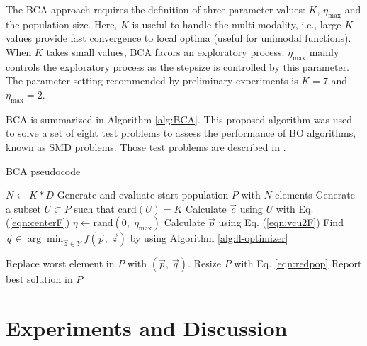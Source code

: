 \documentclass[conference]{IEEEtran}
\begin{document}
The BCA approach requires the definition of three parameter values: $K$, $\eta_{\max}$
and the population size. Here, $K$ is useful to handle the multi-modality, i.e.,
large $K$ values provide fast convergence to local optima (useful for unimodal functions).
When $K$ takes small values, BCA favors an exploratory process. $\eta_{\max}$ mainly
controls the exploratory process as the stepsize is controlled by this parameter.
The parameter setting recommended by preliminary experiments is $K = 7$ and $\eta_{\max} = 2$.

BCA is summarized in Algorithm \ref{alg:BCA}. This proposed algorithm was used to
solve a set of eight test problems to assess the performance of BO algorithms,
known as SMD problems. Those test problems  are described
in \cite{angelo2013differential,sinha2012unconstrained,sinha2014test}.
% 
% 
% 
% 
\begin{algorithm}[!ht]
    \caption{BCA pseudocode}
    \label{alg:BCA}
    \begin{algorithmic}[1]
        \STATE $N \gets K * D$
        \STATE Generate and evaluate start population $P$ with $N$ elements
                \STATE Generate a subset $U \subset P$ such that  card$(U) = K$
                \STATE Calculate $\vec{c}$ using $U$ with Eq. (\ref{eqn:centerF})
                \STATE $\eta \gets \text{rand}(0,\; \eta_{\max}) $ 
                \STATE Calculate $\vec{p}$ using Eq. (\ref{eqn:vcu2F})
                \STATE Find $\displaystyle \vec{q} \in \arg \min_{\vec{z}\in Y} f(\vec{p},\ \vec{z})$ by using Algorithm \ref{alg:ll-optimizer}
                
                    \STATE Replace worst element in $P$ with $(\vec{p},\ \vec{q})$.
                \ENDIF
            \ENDFOR
            \STATE Resize $P$ with Eq. \ref{eqn:redpop}
        \ENDWHILE
        \STATE Report best solution in $P$
    \end{algorithmic}
\end{algorithm}

\section{Experiments and Discussion}
\label{sec:experiments}
\end{document}
